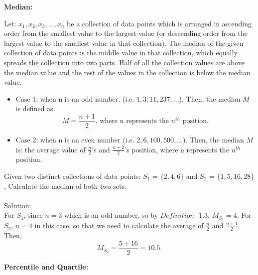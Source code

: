 \textbf{Median:}

\begin{definition}
Let: $x_1, x_2, x_3, ... , x_n$ be a collection of data points which is arranged in ascending order from the smallest value to the largest value (or descending order from the largest value to the smallest value in that collection). The median of the given collection of data points is the middle value in that collection, which equally spreads the collection into two parts. Half of all the collection values are above the median value and the rest of the values in the collection is below the median value.
\begin{itemize}
	\item Case 1: when n is an odd number. (i.e. $1, 3, 11, 237,...$). Then, the median $M$ is defined as: \[ M = \frac{n+1}{2} \text{, where n represents the $n^{th}$ position}.\]
	\item Case 2: when n is an even number (i.e. $2, 6, 100, 500,...$). Then, the median $M$ is: the average value of $\frac{n}{2}$'s and $\frac{n+2}{2}$'s position, where n represents the $n^{th}$ position.
	\end{itemize}
\end{definition}

\begin{example}
Given two distinct collections of data points: $S_1$ = $\{2, 4, 6\}$ and $S_2$ = $\{1, 5, 16, 28\}$. Calculate the median of both two sets.\\

\\

Solution: \\

For $S_1$, since $n = 3$ which is an odd number, so by $Definition \text{ } 1.3$, $M_{S_1} = 4$. For $S_2$, $n = 4$ in this case, so that we need to calculate the average of $\frac{n}{2}$ and $\frac{n+1}{2}$. Then, \[ M_{S_2} = \frac{5+16}{2} = 10.5.\]
\end{example}

\textbf{Percentile and Quartile:}

